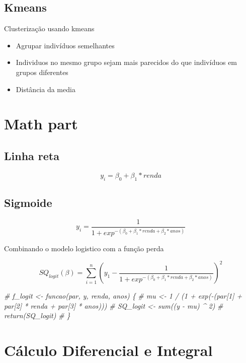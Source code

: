 \documentclass[
]{article}
\newenvironment{Shaded}{\begin{snugshade}}{\end{snugshade}}
\newcommand{\CommentTok}[1]{\textcolor[rgb]{0.56,0.35,0.01}{\textit{#1}}}
\providecommand{\tightlist}{%
  \setlength{\itemsep}{0pt}\setlength{\parskip}{0pt}}
\begin{document}
\hypertarget{kmeans}{%
\subsection{Kmeans}\label{kmeans}}

Clusterização usando kmeans

\begin{itemize}
\tightlist
\item
  Agrupar indivíduos semelhantes
\item
  Individuos no mesmo grupo sejam mais parecidos do que indivíduos em
  grupos diferentes
\item
  Distância da media
\end{itemize}

\hypertarget{math-part}{%
\section{Math part}\label{math-part}}

\hypertarget{linha-reta}{%
\subsection{Linha reta}\label{linha-reta}}

\[y_{i} = \beta_{0} + \beta_{1} * renda\]

\hypertarget{sigmoide}{%
\subsection{Sigmoide}\label{sigmoide}}

\[y_{i} = \frac{1}{1 + exp^{ -(\beta_{0} + \beta_{1} * renda +  \beta_{2} * anos)}} \]

Combinando o modelo logistico com a função perda

\[SQ_{logit}(\beta) = \sum_{i=1}^{n}(y_{1} - \frac{1}{1 + exp^{ -(\beta_{0} + \beta_{1} * renda +  \beta_{2} * anos)}})^2 \]

\begin{Shaded}
\begin{Highlighting}[]
\CommentTok{\# f\_logit \textless{}{-} funcao(par, y, renda, anos) \{}
\CommentTok{\#   mu \textless{}{-} 1 / (1 + exp({-}(par[1] + par[2] * renda + par[3] * anos)))}
\CommentTok{\#   SQ\_logit \textless{}{-} sum((y {-} mu) \^{} 2)}
\CommentTok{\#   return(SQ\_logit)}
\CommentTok{\# \}}
\end{Highlighting}
\end{Shaded}

\hypertarget{cuxe1lculo-diferencial-e-integral}{%
\section{Cálculo Diferencial e
Integral}\label{cuxe1lculo-diferencial-e-integral}}
\end{document}
